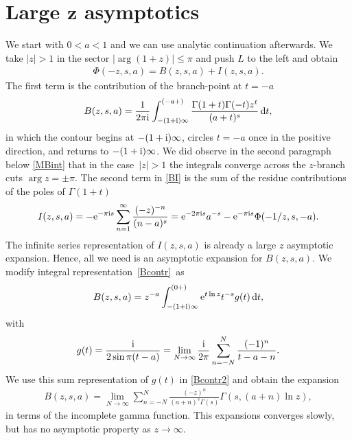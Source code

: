 \documentclass[pdftex]{sigma}
\numberwithin{equation}{section}
\def\expe{{\rm e}}
\def\iunit{{\rm i}}
\def\id{\,{\rm d}}
\begin{document}
\section[Large z asymptotics]{Large $\boldsymbol{z}$ asymptotics}\label{Sect:largez}
We start with $0<a<1$ and we can use analytic continuation afterwards.
We take $|z|>1$ in the sector $|\arg(1+z)|\leq\pi$ and push $L$ to the left and obtain
\begin{gather}\label{BI}
 \Phi(-z,s,a)=B(z,s,a)+I(z,s,a).
\end{gather}
The first term is the contribution of the branch-point at $t=-a$
\begin{gather}\label{Bcontr}
 B(z,s,a)=\frac1{2\pi\iunit}\int_{-(1+\iunit)\infty}^{(-a+)}
 \frac{\Gamma(1+t)\Gamma(-t)z^t}{(a+t)^s}\id t,
\end{gather}
in which the contour begins at $-(1+\iunit)\infty$, circles $t=-a$ once in the positive direction,
and returns to $-(1+\iunit)\infty$. We did observe in the second paragraph below \eqref{MBint}
that in the case~$|z|>1$ the integrals converge across the $z$-branch cuts $\arg z=\pm\pi$.
The second term in \eqref{BI} is the sum of the residue contributions of the poles of $\Gamma(1+t)$
\begin{gather}\label{Icontr}
 I(z,s,a)=-\expe^{-\pi\iunit s}\sum_{n=1}^\infty\frac{(-z)^{-n}}{(n-a)^s}
 =\expe^{-2\pi\iunit s}a^{-s}-\expe^{-\pi\iunit s}\Phi (-1/z,s,-a ).
\end{gather}
The infinite series representation of $I(z,s,a)$ is already a large $z$ asymptotic
expansion. Hence, all we need is an asymptotic expansion for $B(z,s,a)$. We
modify integral representation~\eqref{Bcontr}~as%
\begin{gather}\label{Bcontr2}
 B(z,s,a)=z^{-a}\int_{-(1+\iunit)\infty}^{(0+)}
 \expe^{t\ln z} t^{-s}g(t)\id t,
\end{gather}
with
\begin{gather}\label{g}
 g(t)=\frac{\iunit}{2\sin\pi(t-a)}
 =\lim_{N\to\infty} \frac{\iunit}{2\pi}\sum_{n=-N}^N\frac{(-1)^n}{t-a-n}.
\end{gather}
We use this sum representation of $g(t)$ in \eqref{Bcontr2} and obtain the expansion
\begin{gather}\label{Bgamma}
 B(z,s,a)=\lim_{N\to\infty} \sum_{n=-N}^N \frac{(-z)^n}{(a+n)^s\Gamma(s)}
 \Gamma(s,(a+n)\ln z),
\end{gather}
in terms of the incomplete gamma function. This expansions converges slowly, but has no asymptotic
property as $z\to\infty$.
\end{document}

